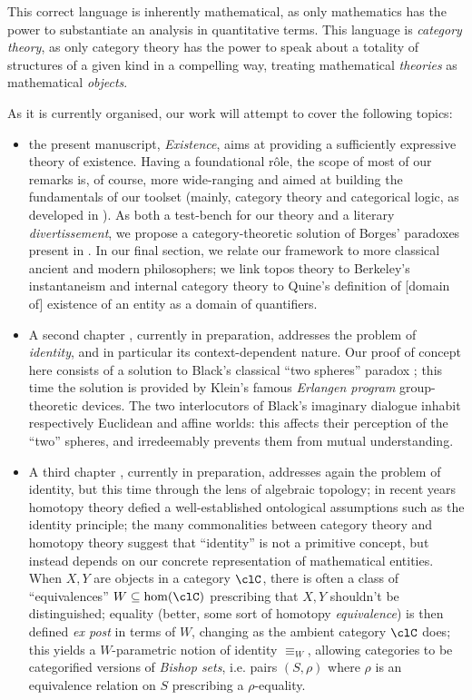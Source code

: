This correct language is inherently mathematical, as only mathematics has the power to substantiate an analysis in quantitative terms. This language is \emph{category theory}, as only category theory has the power to speak about a totality of structures of a given kind in a compelling way, treating mathematical \emph{theories} as mathematical \emph{objects}.

As it is currently organised, our work will attempt to cover the following topics:
\begin{itemize}
    \item the present manuscript, \emph{Existence}, aims at providing a sufficiently expressive theory of existence. Having a foundational r\^ole, the scope of most of our remarks is, of course, more wide-ranging and aimed at building the fundamentals of our toolset (mainly, category theory and categorical logic, as developed in \cite{mac1992sheaves,JohnstonePT,lambek1988introduction}). As both a test-bench for our theory and a literary \emph{divertissement}, we propose a category-theoretic solution of Borges' paradoxes present in \cite{Borges1963}. In our final section, we relate our framework to more classical ancient and modern philosophers; we link topos theory to Berkeley's instantaneism and internal category theory to Quine's definition of [domain of] existence of an entity as a domain of quantifiers.
    \item A second chapter \cite{black}, currently in preparation, addresses the problem of \emph{identity}, and in particular its context-dependent nature. Our proof of concept here consists of a solution to Black's classical ``two spheres'' paradox \cite{papear_di_black}; this time the solution is provided by Klein's famous \emph{Erlangen program} group-theoretic devices. The two interlocutors of Black's imaginary dialogue inhabit respectively Euclidean and affine worlds: this affects their perception of the ``two'' spheres, and irredeemably prevents them from mutual understanding.
    \item A third chapter \cite{homot}, currently in preparation, addresses again the problem of identity, but this time through the lens of algebraic topology; in recent years homotopy theory defied a well\hyp{}established ontological assumptions such as the identity principle; the many commonalities between category theory and homotopy theory suggest that ``identity'' is not a primitive concept, but instead depends on our concrete representation of mathematical entities. When $X,Y$ are objects in a category $\clC$, there is often a class of ``equivalences'' $W \subseteq \hom(\clC)$ prescribing that $X,Y$ shouldn't be distinguished; equality (better, some sort of homotopy \emph{equivalence}) is then defined \emph{ex post} in terms of $W$, changing as the ambient category $\clC$ does; this yields a $W$-parametric notion of identity $\equiv_W$, allowing categories to be categorified versions of \emph{Bishop sets}, i.e. pairs $(S,\rho)$ where $\rho$ is an equivalence relation on $S$ prescribing a $\rho$-equality.
\end{itemize}
